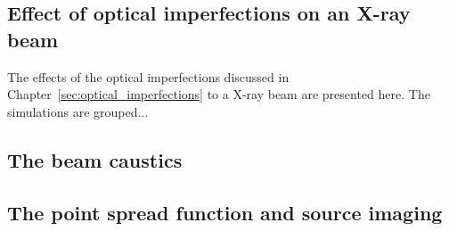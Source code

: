 \begin{refsection}
\chapter{Effect of optical imperfections on an X-ray beam}
\label{sec:effect_optical_imperfections}

The effects of the optical imperfections discussed in Chapter~\ref{sec:optical_imperfections} to a X-ray beam are presented here. The simulations are grouped...

\section{The beam caustics}




\section{The point spread function and source imaging}


\end{refsection}
